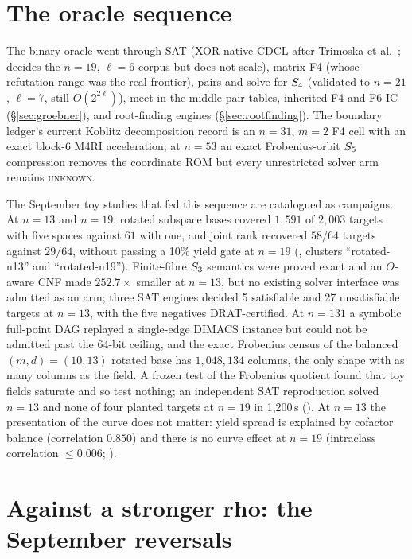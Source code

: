 \section{The oracle sequence}

The binary oracle went through SAT (XOR-native CDCL after Trimoska et
al.~\cite{trimoska2020}; decides the $n=19$, $\ell=6$ corpus but does not
scale), matrix F4 (whose refutation range was the real frontier),
pairs-and-solve for $S_{4}$ (validated to $n=21$, $\ell=7$, still
$O(2^{2\ell})$), meet-in-the-middle pair tables, inherited F4 and F6-IC
(\S\ref{sec:groebner}), and root-finding engines (\S\ref{sec:rootfinding}).
The boundary ledger's current Koblitz decomposition record is an $n=31$,
$m=2$ F4 cell with an exact block-6 M4RI acceleration; at $n=53$ an exact
Frobenius-orbit $S_{5}$ compression removes the coordinate ROM but every
unrestricted solver arm remains \textsc{unknown}.

The September toy studies that fed this sequence are catalogued as
campaigns. At $n=13$ and $n=19$, rotated subspace bases covered $1{,}591$ of
$2{,}003$ targets with five spaces against $61$ with one, and joint rank
recovered $58/64$ targets against $29/64$, without passing a 10\% yield
gate at $n=19$ (, clusters
``rotated-n13'' and ``rotated-n19''). Finite-fibre $S_{3}$ semantics were
proved exact and an $O$-aware CNF made $252.7\times$ smaller at $n=13$, but
no existing solver interface was admitted as an arm; three SAT engines
decided 5 satisfiable and 27 unsatisfiable targets at $n=13$, with the five
negatives DRAT-certified. At $n=131$ a symbolic full-point DAG replayed a
single-edge DIMACS instance but could not be admitted past the 64-bit
ceiling, and the exact Frobenius census of the balanced $(m,d)=(10,13)$
rotated base has $1{,}048{,}134$ columns, the only shape with as many columns
as the field. A frozen test of the Frobenius quotient found that toy fields
saturate and so test nothing; an independent SAT reproduction solved
$n=13$ and none of four planted targets at $n=19$ in 1{,}200\,s
(). At $n=13$ the
presentation of the curve does not matter: yield spread is explained by
cofactor balance (correlation $0.850$) and there is no curve effect at
$n=19$ (intraclass correlation $\le0.006$;
).

\section{Against a stronger rho: the September reversals}\label{sec:koblitz-strong}


